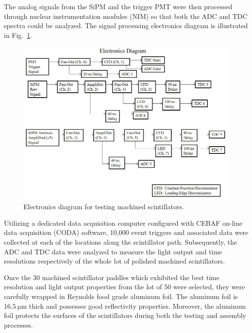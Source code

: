 The analog signals from the SiPM and the trigger PMT were then processed through nuclear instrumentation modules (NIM) so that both the ADC and TDC spectra could be analyzed.  The signal processing electronics diagram is illustrated in Fig.~\ref{fig:nimelectronicsdiagram}.
	\begin{figure}[!htb]
		\centering
		\includegraphics[width=1.0\columnwidth]{fabrication/figs/nim_electronics_diagram}
		\caption{Electronics diagram for testing machined scintillators.}
		\label{fig:nimelectronicsdiagram}
	\end{figure}

Utilizing a dedicated data acquisition computer configured with CEBAF on-line data acquisition (CODA) software, 10,000 event triggers and associated data were collected at each of the locations along the scintillator path.  Subsequently, the ADC and TDC data were analyzed to measure the light output and time resolutions respectively of the whole lot of polished machined scintillators.  

Once the 30 machined scintillator paddles which exhibited the best time resolution and light output properties from the lot of 50 were selected, they were carefully wrapped in Reynolds food grade aluminum foil.  The aluminum foil is $\mathrm{16.5~\mu m}$ thick and possesses good reflectivity properties.  Moreover, the aluminum foil protects the surfaces of the scintillators during both the testing and assembly processes.
  
